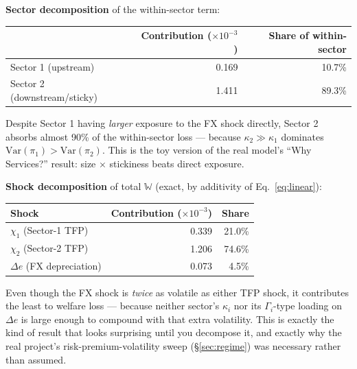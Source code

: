 \documentclass[12pt]{article}
\begin{document}
\textbf{Sector decomposition} of the within-sector term:
\begin{center}
\begin{tabular}{lrr}
\toprule
 & Contribution ($\times10^{-3}$) & Share of within-sector \\
\midrule
Sector 1 (upstream) & 0.169 & 10.7\% \\
Sector 2 (downstream/sticky) & 1.411 & 89.3\% \\
\bottomrule
\end{tabular}
\end{center}
Despite Sector 1 having \emph{larger} exposure to the FX shock directly, Sector 2 absorbs almost
90\% of the within-sector loss — because $\kappa_2 \gg \kappa_1$ dominates $\mathrm{Var}(\pi_1) >
\mathrm{Var}(\pi_2)$. This is the toy version of the real model's ``Why Services?'' result: size
$\times$ stickiness beats direct exposure.

\textbf{Shock decomposition} of total $\mathbb{W}$ (exact, by additivity of Eq.~\ref{eq:linear}):
\begin{center}
\begin{tabular}{lrr}
\toprule
Shock & Contribution ($\times10^{-3}$) & Share \\
\midrule
$\chi_1$ (Sector-1 TFP) & 0.339 & 21.0\% \\
$\chi_2$ (Sector-2 TFP) & 1.206 & 74.6\% \\
$\Delta e$ (FX depreciation) & 0.073 & 4.5\% \\
\bottomrule
\end{tabular}
\end{center}
Even though the FX shock is \emph{twice} as volatile as either TFP shock, it contributes the least
to welfare loss — because neither sector's $\kappa_i$ nor its $\Gamma_i$-type loading on $\Delta e$
is large enough to compound with that extra volatility. This is exactly the kind of result that
looks surprising until you decompose it, and exactly why the real project's risk-premium-volatility
sweep (\S\ref{sec:regime}) was necessary rather than assumed.
\end{document}
